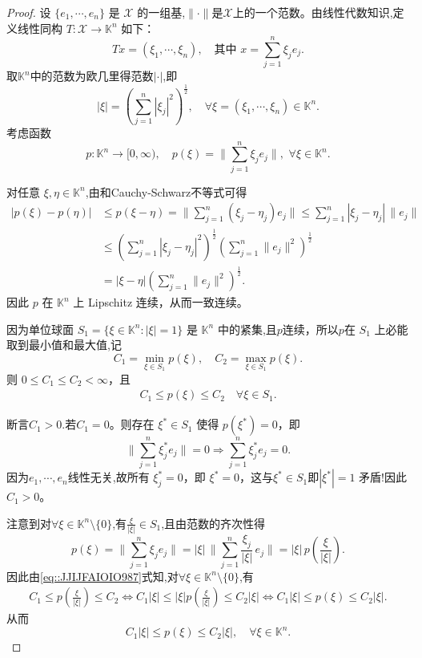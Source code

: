 \documentclass[../../main.tex]{subfiles}%
\begin{document}
\begin{proof}
设 $\{e_1,\cdots,e_n\}$ 是 $\mathscr{X}$ 的一组基,$\|\cdot \|$是$\mathscr{X}$上的一个范数。由线性代数知识,定义线性同构 $T:\mathscr{X}\to\mathbb{K}^n$ 如下：
\[
T x = (\xi_1,\cdots,\xi_n),\quad \text{其中 } x = \sum_{j=1}^n \xi_j e_j.
\]
取$\mathbb{K}^n$中的范数为欧几里得范数$|\cdot|$,即
\[
|\xi| = \left(\sum_{j=1}^n |\xi_j|^2\right)^{\frac{1}{2}},\quad \forall \xi = (\xi_1,\cdots,\xi_n)\in\mathbb{K}^n.
\]
考虑函数
\[
p:\mathbb{K}^n\to[0,\infty),\quad p(\xi) = \biggl\|\sum_{j=1}^n \xi_j e_j\biggr\|,\,\,\forall \xi\in\mathbb{K}^n.
\]

对任意 $\xi,\eta\in\mathbb{K}^n$,由和Cauchy-Schwarz不等式可得
\begin{align*}
|p(\xi)-p(\eta)|
&\leqslant p(\xi-\eta) = \biggl\|\sum_{j=1}^n (\xi_j-\eta_j)e_j\biggr\|
\leqslant \sum_{j=1}^n |\xi_j-\eta_j| \,\|e_j\| \\
&\leqslant \left(\sum_{j=1}^n |\xi_j-\eta_j|^2\right)^{\frac{1}{2}}
\left(\sum_{j=1}^n \|e_j\|^2\right)^{\frac{1}{2}} \\
&= |\xi-\eta| \left(\sum_{j=1}^n \|e_j\|^2\right)^{\frac{1}{2}}.
\end{align*}
因此 $p$ 在 $\mathbb{K}^n$ 上 Lipschitz 连续，从而一致连续。

因为单位球面 $S_1 = \{\xi\in\mathbb{K}^n : |\xi|=1\}$ 是 $\mathbb{K}^n$ 中的紧集,且$p$连续，所以$p$在 $S_1$ 上必能取到最小值和最大值,记
\[
C_1 = \min_{\xi\in S_1} p(\xi),\quad C_2 = \max_{\xi\in S_1} p(\xi).
\]
则 $0\leqslant C_1\leqslant C_2 <\infty$，且
\begin{align}
C_1 \leqslant p(\xi) \leqslant C_2 \quad \forall \xi\in S_1.\label{eq::JJIJFAIOIO987}
\end{align}

断言$C_1>0$.若$C_1=0$。则存在 $\xi^*\in S_1$ 使得 $p(\xi^*)=0$，即
\[
\biggl\|\sum_{j=1}^n \xi_j^* e_j\biggr\| =0 \Longrightarrow\sum_{j=1}^n \xi_j^* e_j = 0.
\]
因为$e_1,\cdots,e_n$线性无关,故所有 $\xi_j^*=0$，即 $\xi^*=0$，这与$\xi^*\in S_1$即$|\xi^*|=1$ 矛盾!因此 $C_1>0$。

注意到对$\forall \xi\in\mathbb{K}^n\setminus\{0\}$,有$\frac{\xi}{|\xi|}\in S_1$,且由范数的齐次性得
\[
p(\xi)=\biggl\|\sum_{j=1}^n \xi_j e_j\biggr\|
=|\xi|\,\biggl\|\sum_{j=1}^n \frac{\xi_j}{|\xi|}\,e_j\biggr\|
=|\xi|\,p\!\left(\frac{\xi}{|\xi|}\right).
\]
因此由\eqref{eq::JJIJFAIOIO987}式知,对$\forall \xi \in\mathbb{K}^n\setminus \{0\}$,有
\begin{align*}
C_1\leqslant p\left( \frac{\xi}{\left| \xi \right|} \right) \leqslant C_2\Longleftrightarrow C_1\left| \xi \right|\leqslant \left| \xi \right|p\left( \frac{\xi}{\left| \xi \right|} \right) \leqslant C_2\left| \xi \right|\Longleftrightarrow C_1|\xi |\leqslant p\left( \xi \right) \leqslant C_2|\xi |.
\end{align*}
从而
\[
C_1 |\xi| \leqslant p(\xi) \leqslant C_2 |\xi|,\quad \forall \xi\in\mathbb{K}^n.
\]


\end{proof}
\end{document}
